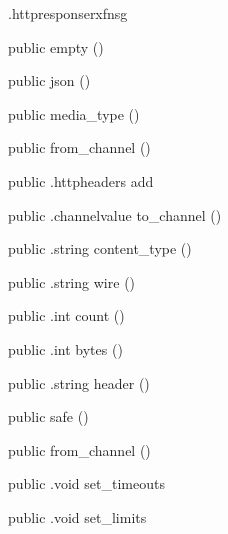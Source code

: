 \begin{CrexxClass}{.httpresponse}{rxfnsg}

  \begin{Hierarchy}
  \end{Hierarchy}

  \begin{Members}

    \Factory
      {public}
      {empty}
      {()}

    \Factory
      {public}
      {json}
      {()}

    \Factory
      {public}
      {media\_type}
      {()}

    \Factory
      {public}
      {from\_channel}
      {()}

    \Method
      {public}
      {.httpheaders}
      {add}
      {}

    \Method
      {public}
      {.channelvalue}
      {to\_channel}
      {()}

    \Method
      {public}
      {.string}
      {content\_type}
      {()}

    \Method
      {public}
      {.string}
      {wire}
      {()}

    \Method
      {public}
      {.int}
      {count}
      {()}

    \Method
      {public}
      {.int}
      {bytes}
      {()}

    \Method
      {public}
      {.string}
      {header}
      {()}

    \Factory
      {public}
      {safe}
      {()}

    \Factory
      {public}
      {from\_channel}
      {()}

    \Method
      {public}
      {.void}
      {set\_timeouts}
      {}

    \Method
      {public}
      {.void}
      {set\_limits}
      {}


\end{Members}
\end{CrexxClass}
